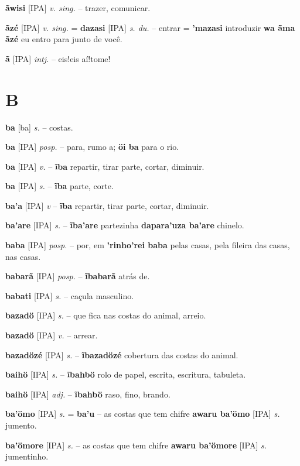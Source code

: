 \textbf{ãwisi} [IPA] \textit{v. sing.} -- trazer, comunicar.

\textbf{ãzé} [IPA] \textit{v. sing.} = \textbf{dazasi} [IPA] \textit{s. du.} -- entrar  = \textbf{'mazasi} introduzir  \textbf{wa ãma ãzé} eu entro para junto de você.

\textbf{ã} [IPA] \textit{intj.} -- eis!eis aí!tome!


\section*{B}


\textbf{ba} [ba] \textit{s.} -- costas.

\textbf{ba} [IPA] \textit{posp.} -- para, rumo a;  \textbf{öi ba} para o rio.

\textbf{ba} [IPA] \textit{v.} -- \textbf{ĩba} repartir, tirar parte, cortar, diminuir.

\textbf{ba} [IPA] \textit{s.} -- \textbf{ĩba} parte, corte.

\textbf{ba'a} [IPA] \textit{v} -- \textbf{ĩba} repartir, tirar parte, cortar, diminuir.

\textbf{ba'are} [IPA] \textit{s.} -- \textbf{ĩba'are} partezinha  \textbf{dapara'uza ba'are} chinelo.

\textbf{baba} [IPA] \textit{posp.} -- por, em  \textbf{'rinho'rei baba} pelas casas, pela fileira das casas, nas casas.

\textbf{babarã} [IPA] \textit{posp.} -- \textbf{ĩbabarã} atrás de.

\textbf{babati} [IPA] \textit{s.} -- caçula masculino.

\textbf{bazadö} [IPA] \textit{s.} -- que fica nas costas do animal, arreio.

\textbf{bazadö} [IPA] \textit{v.} -- arrear.

\textbf{bazadözé} [IPA] \textit{s.} -- \textbf{ĩbazadözé} cobertura das costas do animal.

\textbf{baihö} [IPA] \textit{s.} -- \textbf{ĩbahbö} rolo de papel, escrita, escritura, tabuleta.

\textbf{baihö} [IPA] \textit{adj.} -- \textbf{ĩbahbö} raso, fino, brando.

\textbf{ba'ömo} [IPA] \textit{s.} = \textbf{ba'u} -- as costas que tem chifre  \textbf{awaru ba'ömo} [IPA] \textit{s.} jumento.

\textbf{ba'ömore} [IPA] \textit{s.} -- as costas que tem chifre  \textbf{awaru ba'ömore} [IPA] \textit{s.} jumentinho.

